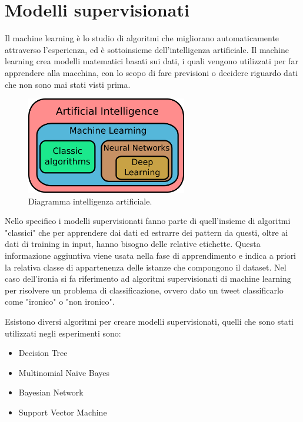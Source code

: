 \documentclass[oneside]{book}
\begin{document}
\section{Modelli supervisionati}
\label{chap:supervised-models}

Il machine learning è lo studio di algoritmi che migliorano automaticamente attraverso l'esperienza, ed è sottoinsieme dell'intelligenza artificiale. Il machine learning crea modelli matematici basati sui dati, i quali vengono utilizzati per far apprendere alla macchina, con lo scopo di fare previsioni o decidere riguardo dati che non sono mai stati visti prima.


\begin{figure}[!h]
	\centering
	\includegraphics[width=7cm]{assets/ai_diagram.png}
	\caption[Caption for LOF]{Diagramma intelligenza artificiale.\footnotemark}
	\label{fig:artificial-intelligence}
\end{figure}


Nello specifico i modelli supervisionati fanno parte di quell'insieme di algoritmi "classici" che per apprendere dai dati ed estrarre dei pattern da questi, oltre ai dati di training in input, hanno bisogno delle relative etichette. Questa informazione aggiuntiva viene usata nella fase di apprendimento e indica a priori la relativa classe di appartenenza delle istanze che compongono il dataset. Nel caso dell'ironia si fa riferimento ad algoritmi supervisionati di machine learning per risolvere un problema di classificazione, ovvero dato un tweet classificarlo come "ironico" o "non ironico".

Esistono diversi algoritmi per creare modelli supervisionati, quelli che sono stati utilizzati negli esperimenti sono:
\begin{itemize}
	\item Decision Tree
	\item Multinomial Naive Bayes
	\item Bayesian Network
	\item Support Vector Machine
\end{itemize}
\end{document}
